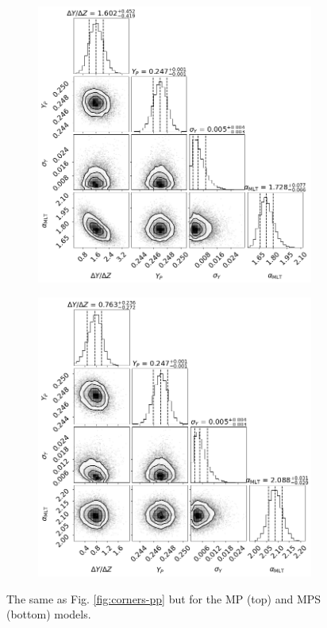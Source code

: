 \begin{figure}
    \centering
    \begin{subfigure}[b]{.66\linewidth}
        \centering
        \includegraphics[width=\textwidth]{figures/corner_plot_mp.png}
    \end{subfigure}

    \begin{subfigure}[b]{.66\linewidth}
        \centering
        \includegraphics[width=\textwidth]{figures/corner_plot_mps.png}
    \end{subfigure}
    \caption{The same as Fig. \ref{fig:corners-pp} but for the MP (top) and MPS (bottom) models.}
    \label{fig:corners-mp}
\end{figure} 

